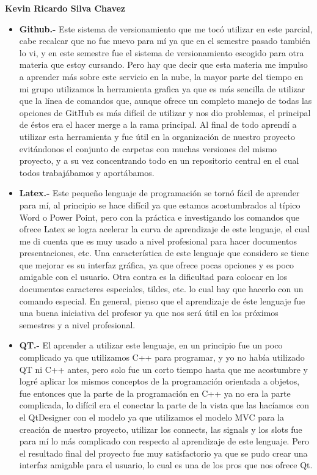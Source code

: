 \documentclass[10pt,oneside]{report}
\begin{document}
{\bf Kevin Ricardo Silva Chavez \newline }
\begin{itemize}\renewcommand{\labelitemi}{$\bullet$}
	\item {\bf Github.-} \textsf{Este sistema de versionamiento que me tocó utilizar en este parcial, cabe recalcar que no fue nuevo para mí ya que en el semestre pasado también lo vi, y en este semestre fue el sistema de versionamiento escogido para otra materia que estoy cursando. Pero hay que decir que esta materia me impulso a aprender más sobre este servicio en la nube, la mayor parte del tiempo en mi grupo utilizamos la herramienta grafica ya que es más sencilla de utilizar que la línea de comandos que, aunque ofrece un completo manejo de todas las opciones de GitHub es más difícil de utilizar y nos dio problemas, el principal de éstos era el hacer merge a la rama principal. Al final de todo aprendí a utilizar esta herramienta y fue útil en la organización de nuestro proyecto evitándonos el conjunto de carpetas con muchas versiones del mismo proyecto, y a su vez concentrando todo en un repositorio central en el cual todos trabajábamos y aportábamos.}
	\item {\bf Latex.-} \textsf{ Este pequeño lenguaje de programación se tornó fácil de aprender para mí, al principio se hace difícil ya que estamos acostumbrados al típico Word o Power Point, pero con la práctica e investigando los comandos que ofrece Latex se logra acelerar la curva de aprendizaje de este lenguaje, el cual me di cuenta que es muy usado a nivel profesional para hacer documentos presentaciones, etc. Una característica de este lenguaje que considero se tiene que mejorar es su interfaz gráfica, ya que ofrece pocas opciones y es poco amigable con el usuario. Otra contra es la dificultad para colocar en los documentos caracteres especiales, tildes, etc. lo cual hay que hacerlo con un comando especial. En general, pienso que el aprendizaje de éste lenguaje fue una buena iniciativa del profesor ya que nos será útil en los próximos semestres y a nivel profesional.}
	\item {\bf QT.-}  \textsf{El aprender a utilizar este lenguaje, en un principio fue un poco complicado ya que utilizamos C++ para programar, y yo no había utilizado QT ni C++ antes, pero solo fue un corto tiempo hasta que me acostumbre y logré aplicar los mismos conceptos de la programación orientada a objetos, fue entonces que la parte de la programación en C++ ya no era la parte complicada, lo difícil era el conectar la parte de la vista que las hacíamos con el QtDesigner con el modelo ya que utilizamos el modelo MVC para la creación de nuestro proyecto, utilizar los connects, las signals y los slots fue para mí lo más complicado con respecto al aprendizaje de este lenguaje. Pero el resultado final del proyecto fue muy satisfactorio ya que se pudo crear una interfaz amigable para el usuario, lo cual es una de los pros que nos ofrece Qt.}

\end{itemize}
\end{document}
